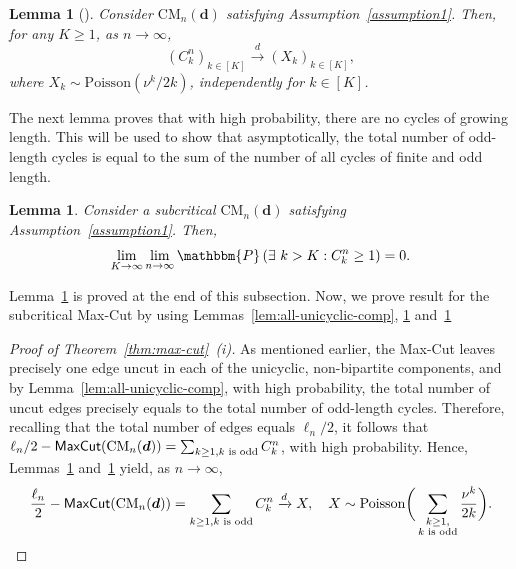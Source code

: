 \documentclass[11pt,a4paper, reqno]{article}
\numberwithin{equation}{section}
\numberwithin{equation}{section}
\newcommand{\prob}[1]{\ensuremath{\mathbbm{P}\left(#1\right)}}
\newcommand{\dto}{\ensuremath{\xrightarrow{d}}}
\newcommand{\1}{\ensuremath{\mathbbm{1}}}
\newcommand{\CM}{\ensuremath{\mathrm{CM}_n(\boldsymbol{d})}}
\newcommand{\Mcut}{{\sf{MaxCut}}}
\newtheorem{lemma}[theorem]{Lemma}
\numberwithin{equation}{section}
\numberwithin{theorem}{section}
\begin{document}
\begin{lemma}[{\cite[Theorem 2.18]{B2012}}] \label{lem:poi-cycle} 
Consider $\CM$ satisfying {\rm Assumption~\ref{assumption1}}. Then, for any $K\geq 1$, as $n\to\infty$,
\begin{equation}
 (C_k^n)_{k\in [K]} \dto (X_k)_{k\in [K]},
\end{equation}where $X_k \sim \mathrm{Poisson} (\nu^k/2k)$, independently for $k\in [K]$.
\end{lemma}
The next lemma proves that with high probability, there are no cycles of growing length.
This will be used to show that asymptotically, the total number of odd-length cycles is equal to the sum of
the number of all cycles of finite and odd length.

\begin{lemma} \label{lem:l1-tight-cycle} Consider a subcritical $\CM$ satisfying {\rm Assumption~\ref{assumption1}}. Then, 
\begin{equation}
 \lim_{K\to\infty}\lim_{n\to\infty} \prob{\exists\ k>K: C_k^n\geq 1 } = 0.
\end{equation}
\end{lemma}
Lemma~\ref{lem:l1-tight-cycle} is proved at the end of this subsection. 
Now, we prove result for the subcritical Max-Cut by using Lemmas~\ref{lem:all-unicyclic-comp}, \ref{lem:poi-cycle} and~\ref{lem:l1-tight-cycle}

\begin{proof}[Proof of Theorem~\ref{thm:max-cut}~(i)] 
As mentioned earlier, the Max-Cut leaves precisely one edge uncut in each of the unicyclic, non-bipartite components, and by Lemma~\ref{lem:all-unicyclic-comp}, with high probability, the total number of uncut edges precisely equals to the total number of odd-length cycles.
Therefore, recalling that the total number of edges equals $\ell_n/2$, it follows that $ \ell_n/2-  \Mcut (\CM)= \sum_{k\geq 1, k \text{ is odd}}C_k^n$, with high probability.
Hence, Lemmas~\ref{lem:poi-cycle} and~\ref{lem:l1-tight-cycle} yield, as $n\to\infty$,
\begin{equation*}
\frac{\ell_n}{2}- \Mcut (\CM)=\sum_{k\geq 1, k \text{ is odd}}C_k^n \dto X,\quad  X\sim \mathrm{Poisson}\bigg(\sum_{\substack{k\geq 1,\\k \text{ is odd}}}\frac{\nu^k}{2k}\bigg).
\end{equation*} 
\end{proof}
\end{document}
